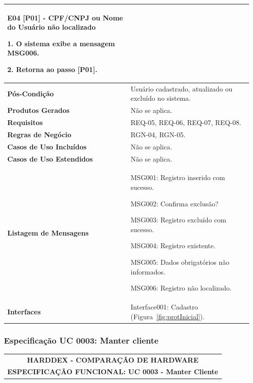 \begin{quadro}[!htbp]
\begin{tabular}{  m{4cm}  m{11cm} }
        \textbf {E04 [P01] - CPF/CNPJ ou Nome do Usuário não localizado}
        
        1. O sistema exibe a mensagem MSG006.      
        
        2. Retorna ao passo [P01].  \\ \hline
	
        \textbf {Pós-Condição}        & Usuário cadastrado, atualizado ou excluído no sistema.  \\ \hline
  	
        \cellcolor{gray!10} \textbf {Produtos Gerados}    & \cellcolor{gray!10} Não se aplica.  \\ \hline
        
        \textbf {Requisitos}          & REQ-05, REQ-06, REQ-07, REQ-08.  \\ \hline
        
        \cellcolor{gray!10} \textbf {Regras de Negócio}   & \cellcolor{gray!10} RGN-04, RGN-05.  \\ \hline
        
        \textbf {Casos de Uso Incluídos} & Não se aplica.  \\ \hline

        \cellcolor{gray!10} \textbf {Casos de Uso Estendidos} & \cellcolor{gray!10} Não se aplica.  \\ \hline
        
        \textbf {Listagem de Mensagens}   & MSG001: Registro inserido com sucesso.
        
        MSG002: Confirma exclusão?

        MSG003: Registro excluído com sucesso.

        MSG004: Registro existente.

        MSG005: Dados obrigatórios não informados.

        MSG006: Registro não localizado.  \\ \hline

        \cellcolor{gray!10} \textbf {Interfaces}   & \cellcolor{gray!10} Interface001: Cadastro (Figura~\ref{fig:protInicial}).
          \\ \hline        
	\end{tabular}
\end{quadro}




\newpage
\subsubsection{Especificação UC 0003: Manter cliente}
\begin{center}
    \begin{tabular}{  | c |  }
        \hline
            \textbf {HARDDEX - COMPARAÇÃO DE HARDWARE}\\
            \textbf {ESPECIFICAÇÃO FUNCIONAL: UC 0003 - Manter Cliente}\\    
           
        \hline
    \end{tabular}
\end{center}

